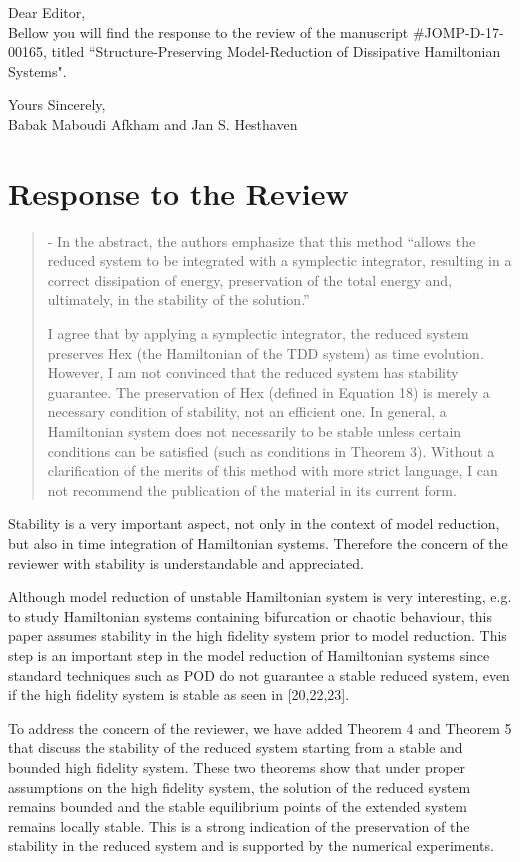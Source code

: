 \documentclass[a4paper]{article}
\newcommand{\breview}{\begin{quotation}\begin{bf}\noindent}
\newcommand{\ereview}{\end{bf}\end{quotation}}
\begin{document}
Dear Editor, \\[1cm]

Bellow you will find the response to the review of the manuscript \#JOMP-D-17-00165, titled ``Structure-Preserving Model-Reduction of Dissipative Hamiltonian Systems".

Yours Sincerely,\\[1.0cm]
Babak Maboudi Afkham and
Jan S. Hesthaven
\\[1cm]

\section*{Response to the Review}

\breview
1- In the abstract, the authors emphasize that this method ``allows the reduced system to be integrated with a symplectic integrator, resulting in a correct dissipation of energy, preservation of the total energy and, ultimately, in the stability of the solution.''

I agree that by applying a symplectic integrator, the reduced system preserves Hex (the Hamiltonian of the TDD system) as time evolution. However, I am not convinced that the reduced system has stability guarantee. The preservation of Hex (defined in Equation 18) is merely a necessary condition of stability, not an efficient one. In general, a  Hamiltonian system does not necessarily to be stable unless certain conditions can be satisfied (such as conditions in Theorem 3). Without a clarification of the merits of this method with more strict language, I can not recommend the publication of the material in its current form. 
\ereview

Stability is a very important aspect, not only in the context of model reduction, but also in time integration of Hamiltonian systems. Therefore the concern of the reviewer with stability is understandable and appreciated.

Although model reduction of unstable Hamiltonian system is very interesting, e.g. to study Hamiltonian systems containing bifurcation or chaotic behaviour, this paper assumes stability in the high fidelity system prior to model reduction. This step is an important step in the model reduction of Hamiltonian systems since standard techniques such as POD do not guarantee a stable reduced system, even if the high fidelity system is stable as seen in [20,22,23].

To address the concern of the reviewer, we have added Theorem 4 and Theorem 5 that discuss the stability of the reduced system starting from a stable and bounded high fidelity system. These two theorems show that under proper assumptions on the high fidelity system, the solution of the reduced system remains bounded and the stable equilibrium points of the extended system remains locally stable. This is a strong indication of the preservation of the stability in the reduced system and is supported by the numerical experiments.
\end{document}
